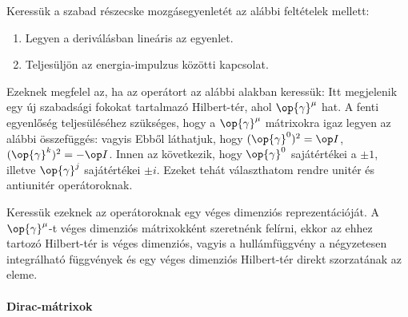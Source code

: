    Keressük a szabad részecske mozgásegyenletét az alábbi feltételek mellett:
   \begin{enumerate}
    \item Legyen a deriválásban lineáris az egyenlet.
    \item Teljesüljön az energia-impulzus közötti kapcsolat.
   \end{enumerate}
   Ezeknek megfelel az, ha az operátort az alábbi alakban keressük:
    Itt megjelenik egy új szabadsági fokokat tartalmazó Hilbert-tér, ahol $\op{\gamma}^\mu$ hat.
   A fenti egyenlőség teljesüléséhez szükséges, hogy a $\op{\gamma}^\mu$ mátrixokra igaz legyen az alábbi összefüggés:
   vagyis
   Ebből láthatjuk, hogy $(\op{\gamma}^0)^2=\op I$, $(\op{\gamma}^k)^2=-\op I$.
   Innen az következik, hogy $\op{\gamma}^0$ sajátértékei a $\pm1$, illetve $\op{\gamma}^j$ sajátértékei $\pm i$.
   Ezeket tehát választhatom rendre unitér és antiunitér operátoroknak. 
   
   Keressük ezeknek az operátoroknak egy véges dimenziós reprezentációját.
   A $\op{\gamma}^\mu$-t véges dimenziós mátrixokként szeretnénk felírni, ekkor az ehhez tartozó Hilbert-tér is véges dimenziós, vagyis a hullámfüggvény a négyzetesen integrálható függvények és egy véges dimenziós Hilbert-tér direkt szorzatának az eleme.
   
   \paragraph{Dirac-mátrixok}
    
